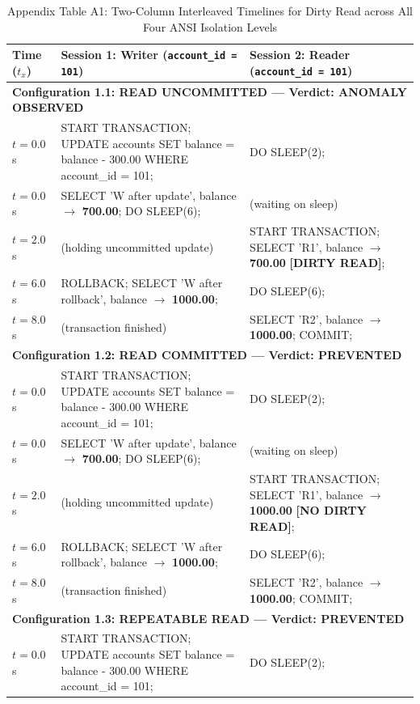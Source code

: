 \documentclass[sigconf, pbalance, nonacm]{acmart}
\begin{document}
\begin{table}[p]
\centering
\small
\caption{Appendix Table A1: Two-Column Interleaved Timelines for Dirty Read across All Four ANSI Isolation Levels}
\label{tab:app_dirty}
\begin{tabularx}{\textwidth}{p{1.8cm} X X}
\toprule
\textbf{Time ($t_x$)} & \textbf{Session 1: Writer (\texttt{account\_id = 101})} & \textbf{Session 2: Reader (\texttt{account\_id = 101})} \\
\midrule
\multicolumn{3}{l}{\textbf{Configuration 1.1: READ UNCOMMITTED --- Verdict: ANOMALY OBSERVED}} \\
$t = 0.0$s & START TRANSACTION; UPDATE accounts SET balance = balance - 300.00 WHERE account\_id = 101; & DO SLEEP(2); \\
$t = 0.0$s & SELECT 'W after update', balance $\rightarrow$ \textbf{700.00}; DO SLEEP(6); & (waiting on sleep) \\
$t = 2.0$s & (holding uncommitted update) & START TRANSACTION; SELECT 'R1', balance $\rightarrow$ \textbf{700.00} \textbf{[DIRTY READ]}; \\
$t = 6.0$s & ROLLBACK; SELECT 'W after rollback', balance $\rightarrow$ \textbf{1000.00}; & DO SLEEP(6); \\
$t = 8.0$s & (transaction finished) & SELECT 'R2', balance $\rightarrow$ \textbf{1000.00}; COMMIT; \\
\midrule
\multicolumn{3}{l}{\textbf{Configuration 1.2: READ COMMITTED --- Verdict: PREVENTED}} \\
$t = 0.0$s & START TRANSACTION; UPDATE accounts SET balance = balance - 300.00 WHERE account\_id = 101; & DO SLEEP(2); \\
$t = 0.0$s & SELECT 'W after update', balance $\rightarrow$ \textbf{700.00}; DO SLEEP(6); & (waiting on sleep) \\
$t = 2.0$s & (holding uncommitted update) & START TRANSACTION; SELECT 'R1', balance $\rightarrow$ \textbf{1000.00} \textbf{[NO DIRTY READ]}; \\
$t = 6.0$s & ROLLBACK; SELECT 'W after rollback', balance $\rightarrow$ \textbf{1000.00}; & DO SLEEP(6); \\
$t = 8.0$s & (transaction finished) & SELECT 'R2', balance $\rightarrow$ \textbf{1000.00}; COMMIT; \\
\midrule
\multicolumn{3}{l}{\textbf{Configuration 1.3: REPEATABLE READ --- Verdict: PREVENTED}} \\
$t = 0.0$s & START TRANSACTION; UPDATE accounts SET balance = balance - 300.00 WHERE account\_id = 101; & DO SLEEP(2); \\

\end{tabularx}
\end{table}
\end{document}

